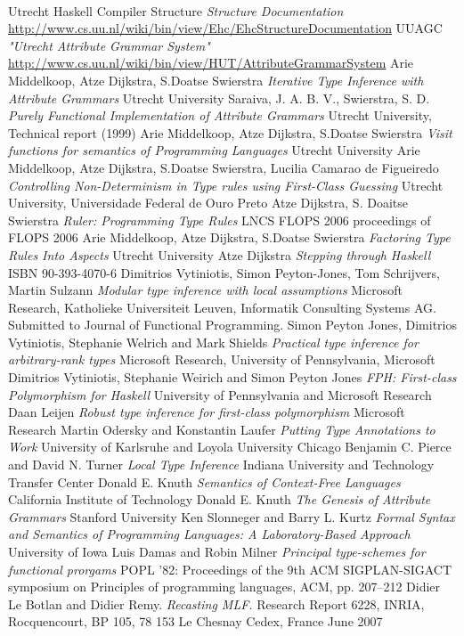 \documentclass[twoside, titlepage, openright, a4paper]{book}
\begin{document}
﻿\begin{thebibliography}{9}
  Utrecht Haskell Compiler Structure
  \emph{Structure Documentation}
   \url{http://www.cs.uu.nl/wiki/bin/view/Ehc/EhcStructureDocumentation}
  UUAGC
  \emph{"Utrecht Attribute Grammar System"}
   \url{http://www.cs.uu.nl/wiki/bin/view/HUT/AttributeGrammarSystem}
  Arie Middelkoop, Atze Dijkstra, S.Doatse Swierstra
  \emph{Iterative Type Inference with Attribute Grammars}
  Utrecht University
  Saraiva, J. A. B. V., Swierstra, S. D.
  \emph{Purely Functional Implementation of Attribute Grammars}
  Utrecht University, Technical report (1999)
  Arie Middelkoop, Atze Dijkstra, S.Doatse Swierstra
  \emph{Visit functions for semantics of Programming Languages}
  Utrecht University
  Arie Middelkoop, Atze Dijkstra, S.Doatse Swierstra, Lucilia Camarao de Figueiredo
  \emph{Controlling Non-Determinism in Type rules using First-Class Guessing}
  Utrecht University, Universidade Federal de Ouro Preto
  Atze Dijkstra, S. Doaitse Swierstra 
  \emph{Ruler: Programming Type Rules}
  LNCS FLOPS 2006 proceedings of FLOPS 2006
  Arie Middelkoop, Atze Dijkstra, S.Doatse Swierstra
  \emph{Factoring Type Rules Into Aspects}
  Utrecht University
  Atze Dijkstra
  \emph{Stepping through Haskell}
  ISBN 90-393-4070-6
  Dimitrios Vytiniotis, Simon Peyton-Jones, Tom Schrijvers, Martin Sulzann
  \emph{Modular type inference with local assumptions}
  Microsoft Research, Katholieke Universiteit Leuven, Informatik Consulting Systems AG.
  Submitted to Journal of Functional Programming.
  Simon Peyton Jones, Dimitrios Vytiniotis, Stephanie Welrich and Mark Shields
  \emph{Practical type inference for arbitrary-rank types}
  Microsoft Research, University of Pennsylvania, Microsoft
  Dimitrios Vytiniotis, Stephanie Weirich and Simon Peyton Jones
  \emph{FPH: First-class Polymorphism for Haskell}
  University of Pennsylvania and Microsoft Research
  Daan Leijen
  \emph{Robust type inference for first-class polymorphism}
  Microsoft Research
  Martin Odersky and Konstantin Laufer
  \emph{Putting Type Annotations to Work}
  University of Karlsruhe and Loyola University Chicago
  Benjamin C. Pierce and David N. Turner
  \emph{Local Type Inference}
  Indiana University and Technology Transfer Center
  Donald E. Knuth
  \emph{Semantics of Context-Free Languages}
  California Institute of Technology
  Donald E. Knuth
  \emph{The Genesis of Attribute Grammars}
  Stanford University
  Ken Slonneger and Barry L. Kurtz
  \emph{Formal Syntax and Semantics of Programming Languages: A Laboratory-Based Approach}
  University of Iowa
  Luis Damas and Robin Milner
  \emph{Principal type-schemes for functional prorgams}
  POPL '82: Proceedings of the 9th ACM SIGPLAN-SIGACT symposium on Principles of programming languages, ACM, pp. 207–212
  Didier Le Botlan and Didier Remy.
  \emph{Recasting MLF.}
  Research Report 6228, INRIA, Rocquencourt, BP 105, 78 153 Le Chesnay Cedex, France June 2007
\end{thebibliography}
\end{document}
